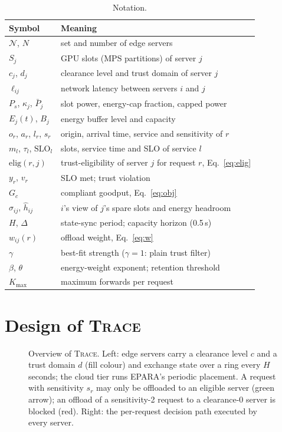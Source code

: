 \documentclass[journal]{IEEEtran}
\newcommand{\sys}{\textsc{Trace}}
\begin{document}
\begin{table}[t]
\centering
\caption{Notation.}\label{tab:notation}
\footnotesize
\begin{tabular}{@{}ll@{}}
\toprule
Symbol & Meaning \\
\midrule
$\mathcal{N}$, $N$ & set and number of edge servers \\
$S_j$ & GPU slots (MPS partitions) of server $j$ \\
$c_j$, $d_j$ & clearance level and trust domain of server $j$ \\
$\ell_{ij}$ & network latency between servers $i$ and $j$ \\
$P_s$, $\kappa_j$, $\bar P_j$ & slot power, energy-cap fraction, capped power \\
$E_j(t)$, $B_j$ & energy buffer level and capacity \\
$o_r$, $a_r$, $l_r$, $s_r$ & origin, arrival time, service and sensitivity of $r$ \\
$m_l$, $\tau_l$, $\mathrm{SLO}_l$ & slots, service time and SLO of service $l$ \\
$\mathrm{elig}(r,j)$ & trust-eligibility of server $j$ for request $r$, Eq.~\eqref{eq:elig} \\
$y_r$, $v_r$ & SLO met; trust violation \\
$G_c$ & compliant goodput, Eq.~\eqref{eq:obj} \\
$\hat\sigma_{ij}$, $\hat h_{ij}$ & $i$'s view of $j$'s spare slots and energy headroom \\
$H$, $\Delta$ & state-sync period; capacity horizon (0.5\,s) \\
$w_{ij}(r)$ & offload weight, Eq.~\eqref{eq:w} \\
$\gamma$ & best-fit strength ($\gamma=1$: plain trust filter) \\
$\beta$, $\theta$ & energy-weight exponent; retention threshold \\
$K_{\max}$ & maximum forwards per request \\
\bottomrule
\end{tabular}
\end{table}

\section{Design of \sys}\label{sec:design}

\begin{figure}[t]
\centering
\resizebox{\textwidth}{!}{%
}
\caption{Overview of \sys{}. Left: edge servers carry a clearance level $c$ and a trust domain $d$ (fill colour) and exchange state over a ring every $H$ seconds; the cloud tier runs EPARA's periodic placement. A request with sensitivity $s_r$ may only be offloaded to an eligible server (green arrow); an offload of a sensitivity-2 request to a clearance-0 server is blocked (red). Right: the per-request decision path executed by every server.}
\label{fig:arch}
\end{figure}
\end{document}
